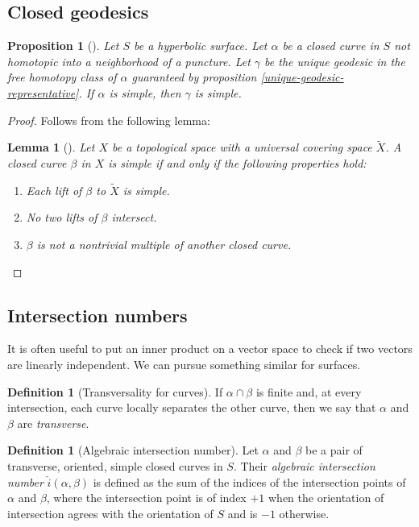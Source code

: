 \documentclass[reqno]{amsart}
\newtheorem{lemma}[theorem]{Lemma}
\newtheorem{proposition}[theorem]{Proposition}
\theoremstyle{definition}
\newtheorem{definition}[theorem]{Definition}
\theoremstyle{remark}
\begin{document}
\subsection{Closed geodesics}

\begin{proposition}[]
    Let $S$ be a hyperbolic surface. Let $\alpha$ be a closed curve
    in $S$ not homotopic into a neighborhood of a puncture. Let
    $\gamma$ be the unique geodesic in the free homotopy class of
    $\alpha$ guaranteed by proposition \ref{unique-geodesic-representative}.
    If $\alpha$ is simple, then $\gamma$ is simple.
\end{proposition}

\begin{proof}
    Follows from the following lemma:
    \begin{lemma}[]\label{simple-loop-lifts}
        Let $X$ be a topological space with a universal covering space
         $\tilde{X}$. A closed curve $\beta$ in $X$ is simple if and
        only if the following properties hold:
        \begin{enumerate}
            \item Each lift of $\beta$ to $\tilde{X}$ is simple.
            \item No two lifts of $\beta$ intersect.
            \item  $\beta$ is not a nontrivial multiple of another closed
                curve.
         \end{enumerate}
    \end{lemma}
\end{proof}

\subsection{Intersection numbers}

It is often useful to put an inner product on a vector space to check
if two vectors are linearly independent. We can pursue something similar for
surfaces.


\begin{definition}[Transversality for curves]
If $\alpha \cap \beta$ is finite and, at every intersection, each
curve locally separates the other curve, then we say that
$\alpha$ and $\beta$ are \textit{transverse}.
\end{definition}

\begin{definition}[Algebraic intersection number]
    Let $\alpha$ and $\beta$ be a pair of transverse, oriented,
    simple closed curves in $S$. Their \textit{algebraic intersection
    number} $\hat{i}\left( \alpha,\beta \right) $ is
    defined as the sum of the indices
    of the intersection points of $\alpha$ and $\beta$,
    where the intersection point is of index $+1$ when the
    orientation of intersection agrees with
    the orientation of $S$ and is $-1$ otherwise.
\end{definition}
\end{document}
